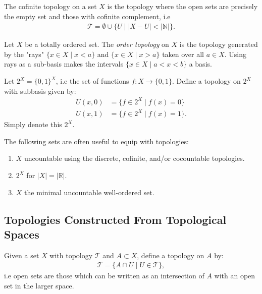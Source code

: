 \documentclass[12pt,letterpaper,reqno]{article}
\begin{document}
\begin{topology}\label{topology:cofinite-topology}
    The cofinite topology on a set $X$ is the topology where the open sets are precisely the empty set and those with cofinite complement, i.e
    \begin{align*}
        \mathcal{T} = \emptyset \cup \{ U \mid |X - U| < | \mathbb{N}| \}.
    \end{align*}
\end{topology}

\begin{topology}\label{topology:order-topology}
    Let $X$ be a totally ordered set. The \textit{order topology} on $X$ is the topology generated by the "rays" $\{ x \in X \mid x < a \}$ and $\{ x \in X \mid x > a \}$ taken over all $a \in X$. Using rays as a sub-basis makes the intervals $\{x \in X \mid a < x < b \}$ a basis. 
\end{topology}

\begin{topology}\label{topology:2X-topology}
    Let $2^{X} = \{0, 1\}^{X}$, i.e the set of functions $f: X \to \{ 0, 1\}$. Define a topology on $2^{X}$ with subbasis given by:
    \begin{align*}
        U(x, 0) &= \{ f \in 2^{X} \mid f(x) = 0 \} \\
        U(x, 1) &= \{ f \in 2^{X} \mid f(x) = 1 \}.
    \end{align*}
    Simply denote this $2^{X}$.
\end{topology}


The following sets are often useful to equip with topologies:

\begin{enumerate}
    \item $X$ uncountable using the discrete, cofinite, and/or cocountable topologies.
    \item $2^{X}$ for $|X| = |\mathbb{R}|$.
    \item $X$ the minimal uncountable well-ordered set.
\end{enumerate}


\subsection{Topologies Constructed From Topological Spaces}

\begin{topology}\label{topology:subspace-topology}
    Given a set $X$ with topology $\mathcal{T}$ and $A \subset X$, define a topology on $A$ by:
    \begin{align*}
        \mathcal{T} = \{ A \cap U \mid U \in \mathcal{T} \},
    \end{align*}
    i.e open sets are those which can be written as an intersection of $A$ with an open set in the larger space. 
\end{topology}
\end{document}
